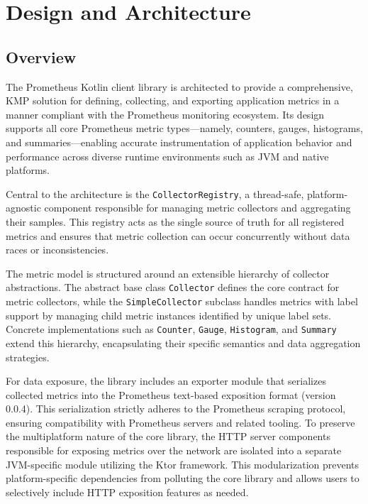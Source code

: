 \chapter{Design and Architecture} \label{ch:architecture}

\section{Overview}\label{sec:overview}

The Prometheus Kotlin client library is architected to provide a comprehensive, \ac{KMP} solution for
defining, collecting, and exporting application metrics in a manner compliant with the Prometheus monitoring ecosystem.
Its design supports all core Prometheus metric types—namely, counters, gauges, histograms, and summaries—enabling
accurate instrumentation of application behavior and performance across diverse runtime environments such as \ac{JVM} and native platforms.

Central to the architecture is the \texttt{CollectorRegistry}, a thread-safe, platform-agnostic component responsible for managing metric collectors and aggregating their samples.
This registry acts as the single source of truth for all registered metrics and ensures that metric collection can occur concurrently without data races or inconsistencies.

The metric model is structured around an extensible hierarchy of collector abstractions.
The abstract base class \texttt{Collector} defines the core contract for metric collectors, while the \texttt{SimpleCollector} subclass handles metrics with label support by managing child metric instances identified by unique label sets.
Concrete implementations such as \texttt{Counter}, \texttt{Gauge}, \texttt{Histogram}, and \texttt{Summary} extend this hierarchy, encapsulating their specific semantics and data aggregation strategies.

For data exposure, the library includes an exporter module that serializes collected metrics into the Prometheus
text-based exposition format (version 0.0.4)\cite{prometheus_exposition_formats}.
This serialization strictly adheres to the Prometheus scraping protocol, ensuring compatibility with Prometheus servers and related tooling.
To preserve the multiplatform nature of the core library, the HTTP server components responsible for exposing
metrics over the network are isolated into a separate \ac{JVM}-specific module utilizing the Ktor framework.
This modularization prevents platform-specific dependencies from polluting the core library and allows users to selectively include HTTP exposition features as needed.

